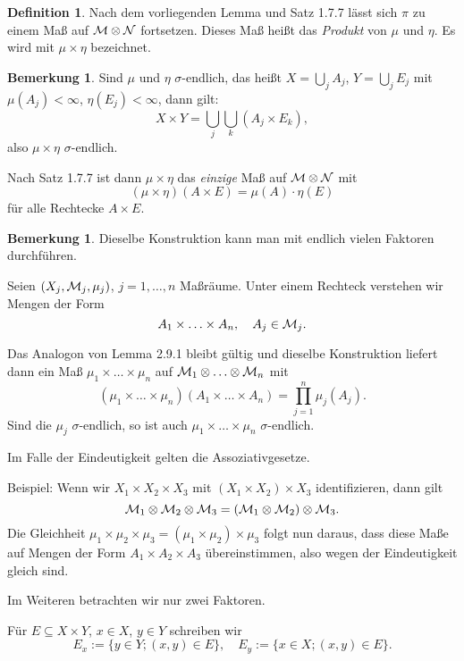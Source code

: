 \documentclass[
 a4paper,
 12pt,
 parskip=half
 ]{scrreprt}
\theoremstyle{plain}
\theoremstyle{definition}
\newtheorem{defn}[thm]{Definition}
\newtheorem{rmrk}[thm]{Bemerkung}
\numberwithin{equation}{section}
\begin{document}
\begin{defn}
 Nach dem vorliegenden Lemma und Satz 1.7.7 lässt sich $\pi$ zu einem Maß auf $\mathcal{M} \otimes \mathcal{N}$ fortsetzen. Dieses Maß heißt das \emph{Produkt} von $\mu$ und $\eta$. Es wird mit $\mu \times \eta$ bezeichnet.
\end{defn}

\begin{rmrk}
 Sind $\mu$ und $\eta$ $\sigma$-endlich, das heißt $X = \bigcup_j A_j$, $Y = \bigcup_j E_j$ mit $\mu(A_j) < \infty$, $\eta(E_j) < \infty$, dann gilt:
 \[ X \times Y = \bigcup_j \bigcup_k (A_j \times E_k), \]
 also $\mu \times \eta$ $\sigma$-endlich.
 
 Nach Satz 1.7.7 ist dann $\mu \times \eta$ das \emph{einzige} Maß auf $\mathcal{M} \otimes \mathcal{N}$ mit 
 \[ (\mu \times \eta)(A \times E) = \mu(A) \cdot \eta(E) \]
 für alle Rechtecke $A \times E$.
\end{rmrk}

\begin{rmrk}
 Dieselbe Konstruktion kann man mit endlich vielen Faktoren durch\-führen.
 
 Seien $(X_j, \mathcal{M}_j, \mu_j)$, $j = 1, \ldots, n$ Maßräume. Unter einem Rechteck verstehen wir Mengen der Form
 \[ A_1 \times \ldots \times A_n, \quad A_j \in \mathcal{M}_j. \]
 
 Das Analogon von Lemma 2.9.1 bleibt gültig und dieselbe Konstruktion liefert dann ein Maß $\mu_1 \times \ldots \times \mu_n$ auf $\mathcal{M}_1 \otimes \ldots \otimes \mathcal{M}_n$ mit
 \[ (\mu_1 \times \ldots \times \mu_n)( A_1 \times \ldots \times A_n ) = \prod_{j=1}^n \mu_j(A_j). \]
 Sind die $\mu_j$ $\sigma$-endlich, so ist auch $\mu_1 \times \ldots \times \mu_n$ $\sigma$-endlich.
 
 Im Falle der Eindeutigkeit gelten die Assoziativgesetze. 
 
 Beispiel: Wenn wir $X_1 \times X_2 \times X_3$ mit $(X_1 \times X_2) \times X_3$ identifizieren, dann gilt
 \[ \mathcal{M}_1 \otimes \mathcal{M}_2 \otimes \mathcal{M}_3 = (\mathcal{M}_1 \otimes \mathcal{M}_2) \otimes \mathcal{M}_3. \]
 Die Gleichheit $\mu_1 \times \mu_2 \times \mu_3 = ( \mu_1 \times \mu_2 ) \times \mu_3$ folgt nun daraus, dass diese Maße auf Mengen der Form $A_1 \times A_2 \times A_3$ übereinstimmen, also wegen der Eindeutigkeit gleich sind.
\end{rmrk}

Im Weiteren betrachten wir nur zwei Faktoren.

Für $E \subseteq X \times Y$, $x \in X$, $y \in Y$ schreiben wir
\[ E_x := \{ y \in Y; (x,y) \in E \}, \quad E_y := \{ x \in X; (x,y) \in E \}. \]
\end{document}
